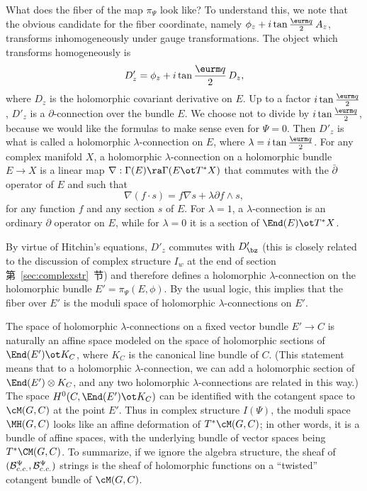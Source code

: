 What does the fiber of the map $\pi_\Psi$ look like? To understand
this, we note that the obvious candidate for the fiber coordinate,
namely $\phi_z+i\tan{{\eurm q}\over 2}\, A_z$, transforms
inhomogeneously under gauge transformations. The object which
transforms homogeneously is %
\setcounter{equation}{35}
\begin{equation}\label{eq:gyko}
D'_z=\phi_z+i\tan{{\eurm
q}\over 2}\, D_z,
\end{equation}
 where $D_z$ is the holomorphic covariant
derivative on $E$. Up to a factor $i\tan{{\eurm q}\over 2}$,
$D'_z$ is a $\partial$-connection over the bundle $E$. We choose
not to divide by $i\tan{{\eurm q}\over 2}$, because we would like
the formulas to make sense even for $\Psi=0$. Then $D'_z$ is what
is called a holomorphic $\lambda$-connection on $E$, where
$\lambda=i\tan{{\eurm q}\over 2}$. For any complex manifold $X$, a
holomorphic $\lambda$-connection on a holomorphic bundle $E\to X$
is a linear map $\nabla: \Gamma(E)\ra \Gamma(E\ot T^*X)$ that
commutes with the $\bar\partial$ operator of $E$ and such that
\setcounter{equation}{36}
\begin{equation}\label{eq:hyfo}
\nabla (f\cdot s)=f\nabla s + \lambda
\partial f\wedge s,
\end{equation}
 for any function $f$ and any  section $s$ of
$E$. For $\lambda=1$, a $\lambda$-connection is an ordinary
$\partial$ operator on $E$, while for $\lambda=0$ it is a section
of $\End(E)\ot T^*X$.

By virtue of Hitchin's equations, $D'_z$ commutes with $D'_\bz$
(this is closely related to the discussion of complex structure
$I_w$ at the end of section 第~\ref{sec:complexstr}~节) and therefore defines a
holomorphic $\lambda$-connection on the holomorphic bundle
$E'=\pi_\Psi(E,\phi)$. By the usual logic, this implies that the
fiber over $E'$ is the moduli space of holomorphic
$\lambda$-connections on $E'$.

The space of holomorphic $\lambda$-connections on a fixed vector
bundle $E'\to C$ is naturally an affine space modeled on the space
of holomorphic sections of $\End(E')\ot K_C$, where $K_C$ is the
canonical line bundle of $C$. (This statement means that to a
holomorphic $\lambda$-connection, we can add a holomorphic section
of $\End(E')\otimes K_C$, and any two holomorphic
$\lambda$-connections are related in this way.)  The space
$H^0(C,\End(E')\ot K_C)$ can be identified with the cotangent
space to $\cM(G,C)$ at the point $E'$. Thus in complex structure
$I(\Psi)$, the moduli space $\MH(G,C)$ looks like an affine
deformation of $T^*\cM(G,C)$; in other words, it is a bundle of
affine spaces, with the underlying bundle of vector spaces being
$T^*\CM(G,C)$. To summarize, if we ignore the algebra structure,
the sheaf of $({\cal B}_{c.c.}^\Psi,{\cal B}_{c.c.}^\Psi)$ strings
is the sheaf of holomorphic functions on a ``twisted'' cotangent
bundle of $\cM(G,C)$.

